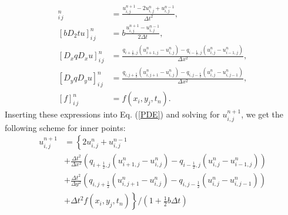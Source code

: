 \documentclass[twoside]{article}
\begin{document}
\begin{align}
[D_{t} D_{t} u]_{i\, j}^{n} &= \frac{u^{n+1}_{i, j} - 2u^{n}_{i, j} + u^{n-1}_{i, j}}{\Delta t^{2}} \label{Dttu}, \\
[bD_{2}t u]_{i\, j}^n &= b\frac{u^{n+1}_{i,j} - u^{n-1}_{i,j}}{2\Delta t} \label{bD2tu}, \\
[D_x q D_x u]_{i\, j}^n &= \frac{q_{i +\frac{1}{2},j}(u^{n}_{i+1,j} - u^{n}_{i,j}) - q_{i -\frac{1}{2},j}(u^{n}_{i,j} - u^{n}_{i-1,j})}{\Delta x^2} \label{DxqDxu}, \\
[D_y q D_y u]_{i\, j}^n &= \frac{q_{i,j +\frac{1}{2}}(u^{n}_{i,j+1} - u^{n}_{i,j}) - q_{i ,j-\frac{1}{2}}(u^{n}_{i,j} - u^{n}_{i,j-1})}{\Delta x^2} \label{DyqDyu}, \\
[f]_{i\, j}^n &= f(x_i, y_{j}, t_{n}). \label{f}
\end{align}
Inserting these expressions into Eq. (\ref{PDE}) and solving for $u^{n+1}_{i,j}$, we get the following scheme for inner points:
\begin{align}
u^{n+1}_{i,j} &= \left\{ 2u^{n}_{i,j} + u^{n-1}_{i,j} \right. \nonumber \\
& \left. + \frac{\Delta t^2}{\Delta x^2}\left(q_{i +\frac{1}{2},j}(u^{n}_{i+1,j} - u^{n}_{i,j}) - q_{i -\frac{1}{2},j}(u^{n}_{i,j} - u^{n}_{i-1,j})\right) \right. \nonumber \\ 
&\left. +  \frac{\Delta t^2}{\Delta y^2} \left(q_{i,j +\frac{1}{2}}(u^{n}_{i,j+1} - u^{n}_{i,j}) - q_{i ,j-\frac{1}{2}}(u^{n}_{i,j} - u^{n}_{i,j-1})\right) \right. \nonumber \\
&\left. + \Delta t^{2} f(x_i, y_j, t_n) \right\}/\left( 1 + \frac{1}{2}b\Delta t \right)
\end{align}
\end{document}

